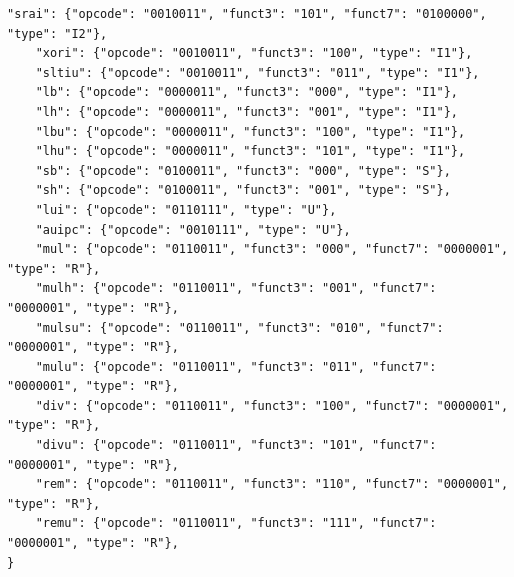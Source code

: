 \documentclass[11pt]{article}
\begin{document}
\begin{lstlisting}[style=mypython, caption=The Instructions Set, label=lst:instrcutions]
    "srai": {"opcode": "0010011", "funct3": "101", "funct7": "0100000", "type": "I2"},
    "xori": {"opcode": "0010011", "funct3": "100", "type": "I1"},
    "sltiu": {"opcode": "0010011", "funct3": "011", "type": "I1"},
    "lb": {"opcode": "0000011", "funct3": "000", "type": "I1"},
    "lh": {"opcode": "0000011", "funct3": "001", "type": "I1"},
    "lbu": {"opcode": "0000011", "funct3": "100", "type": "I1"},
    "lhu": {"opcode": "0000011", "funct3": "101", "type": "I1"},
    "sb": {"opcode": "0100011", "funct3": "000", "type": "S"},
    "sh": {"opcode": "0100011", "funct3": "001", "type": "S"},
    "lui": {"opcode": "0110111", "type": "U"},
    "auipc": {"opcode": "0010111", "type": "U"},
    "mul": {"opcode": "0110011", "funct3": "000", "funct7": "0000001", "type": "R"},
    "mulh": {"opcode": "0110011", "funct3": "001", "funct7": "0000001", "type": "R"},
    "mulsu": {"opcode": "0110011", "funct3": "010", "funct7": "0000001", "type": "R"},
    "mulu": {"opcode": "0110011", "funct3": "011", "funct7": "0000001", "type": "R"},
    "div": {"opcode": "0110011", "funct3": "100", "funct7": "0000001", "type": "R"},
    "divu": {"opcode": "0110011", "funct3": "101", "funct7": "0000001", "type": "R"},
    "rem": {"opcode": "0110011", "funct3": "110", "funct7": "0000001", "type": "R"},
    "remu": {"opcode": "0110011", "funct3": "111", "funct7": "0000001", "type": "R"},
}


\end{lstlisting}
\end{document}

